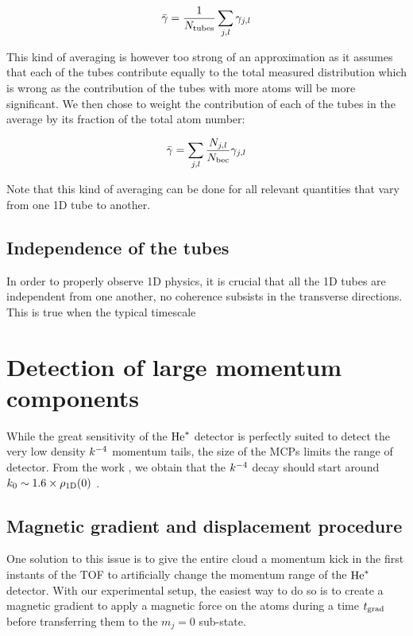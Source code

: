 \begin{equation}
    \bar{\gamma} = \frac{1}{N_{\rm{tubes}}} \sum_{j,l} \gamma_{j,l}
\end{equation}

\noindent This kind of averaging is however too strong of an approximation as it assumes that each of the tubes contribute equally to the total measured distribution which is wrong as the contribution of the tubes with more atoms will be more significant. We then chose to weight the contribution of each of the tubes in the average by its fraction of the total atom number:

\begin{equation}
    \bar{\gamma} = \sum_{j,l} \frac{N_{j,l}}{N_{\rm{bec}}} \gamma_{j,l}
\end{equation}

\noindent Note that this kind of averaging can be done for all relevant quantities that vary from one 1D tube to another.



\subsection{Independence of the tubes}

In order to properly observe 1D physics, it is crucial that all the 1D tubes are independent from one another, \ie no coherence subsists in the transverse directions. This is true when the typical timescale 

\section{Detection of large momentum components}

While the great sensitivity of the $\mathrm{He}^*$ detector is perfectly suited to detect the very low density $k^{-4}$ momentum tails, the size of the MCPs limits the range of detector. From the work \cite{xu2015universal}, we obtain that the $k^{-4}$ decay should start around $k_0 \sim 1.6 \times \rho_{\rm{1D}}(0)$ .

\subsection{Magnetic gradient and displacement procedure}

One solution to this issue is to give the entire cloud a momentum kick in the first instants of the TOF to artificially change the momentum range of the $\mathrm{He}^*$ detector. With our experimental setup, the easiest way to do so is to create a magnetic gradient to apply a magnetic force on the atoms during a time $t_{\rm{grad}}$ before transferring them to the $m_j=0$ sub-state. 

